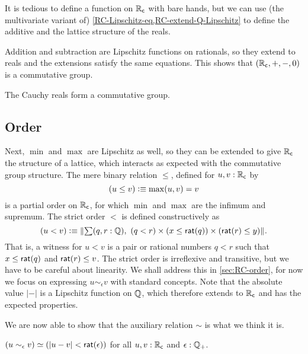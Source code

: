 It is tedious to define a function on $\mathbb{R}_\mathsf{c}$ with bare hands, but we can use (the
multivariate variant of) \autoref{RC-Lipschitz-eq,RC-extend-Q-Lipschitz} to define the
additive and the lattice structure of the reals.

Addition and subtraction are Lipschitz functions on rationals, so they extend to reals and
the extensions satisfy the same equations. This shows that $(\mathbb{R}_\mathsf{c}, {+}, {-}, 0)$ is a
commutative group.

\begin{thm} \label{RC-commutative-group}
  The Cauchy reals form a commutative group.
\end{thm}

\subsection{Order}
\label{sec:order}

Next, $\min$ and $\max$ are Lipschitz as well, so they can be extended to give $\mathbb{R}_\mathsf{c}$ the
structure of a lattice, which interacts as expected with the commutative group structure.
The mere binary relation $\leq$, defined for $u, v : \mathbb{R}_\mathsf{c}$ by
%
\begin{equation*}
  (u \leq v) \vcentcolon\equiv \max(u,v) = v
\end{equation*}
%
is a partial order on $\mathbb{R}_\mathsf{c}$, for which $\min$ and $\max$ are the infimum and supremum. The
strict order $<$ is defined constructively as
%
\begin{equation*}
  (u < v) \defeq
  \brck{\sm{q, r : \Q} (q < r) \times (x \leq \rcrat(q)) \times (\rcrat(r) \leq y)}.
\end{equation*}
%
That is, a witness for $u < v$ is a pair or rational numbers $q < r$ such that $x \leq
\mathsf{rat}(q)$ and $\mathsf{rat}(r) \leq v$. The strict order is irreflexive and transitive, but we
have to be careful about linearity. We shall address this in \autoref{sec:RC-order}, for
now we focus on expressing $u \sim_\epsilon v$ with standard concepts. Note that the
absolute value $|{-}|$ is a Lipschitz function on $\mathbb{Q}$, which therefore extends to $\mathbb{R}_\mathsf{c}$
and has the expected properties.

We are now able to show that the auxiliary relation $\sim$ is what we think it is.

\begin{thm} \label{RC-sim-eqv-le}
  $(u \sim_\epsilon v) \simeq (|u - v| < \mathsf{rat}(\epsilon))$
  for all $u, v : \mathbb{R}_\mathsf{c}$ and $\epsilon : \mathbb{Q}_{+}$.
\end{thm}

